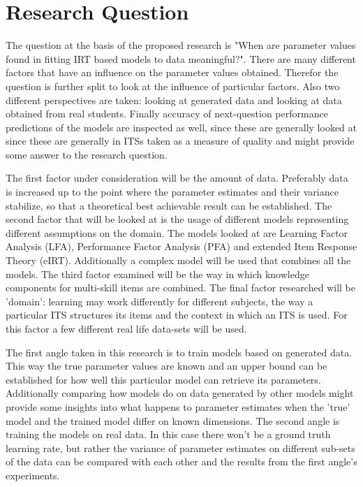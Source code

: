 \documentclass{article}
\begin{document}
\section{Research Question}
\label{sec:RQ}
The question at the basis of the proposed research is "When are parameter values found in fitting IRT based models to data meaningful?". There are many different factors that have an influence on the parameter values obtained. Therefor the question is further split to look at the influence of particular factors. Also two different perspectives are taken: looking at generated data and looking at data obtained from real students. Finally accuracy of next-question performance predictions of the models are inspected as well, since these are generally looked at since these are generally in ITSs taken as a measure of quality and might provide some answer to the research question.

The first factor under consideration will be the amount of data. Preferably data is increased up to the point where the parameter estimates and their variance stabilize, so that a theoretical best achievable result can be established. The second factor that will be looked at is the usage of different models representing different assumptions on the domain. The models looked at are Learning Factor Analysis (LFA), Performance Factor Analysis (PFA) and extended Item Response Theory (eIRT). Additionally a complex model will be used that combines all the models. The third factor examined will be the way in which knowledge components for multi-skill items are combined. The final factor researched will be 'domain': learning may work differently for different subjects, the way a particular ITS structures its items and the context in which an ITS is used. For this factor a few different real life data-sets will be used.

The first angle taken in this research is to train models based on generated data. This way the true parameter values are known and an upper bound can be established for how well this particular model can retrieve its parameters. Additionally comparing how models do on data generated by other models might provide some insights into what happens to parameter estimates when the 'true' model and the trained model differ on known dimensions. The second angle is training the models on real data. In this case there won't be a ground truth learning rate, but rather the variance of parameter estimates on different sub-sets of the data can be compared with each other and the results from the first angle's experiments.
\end{document}
